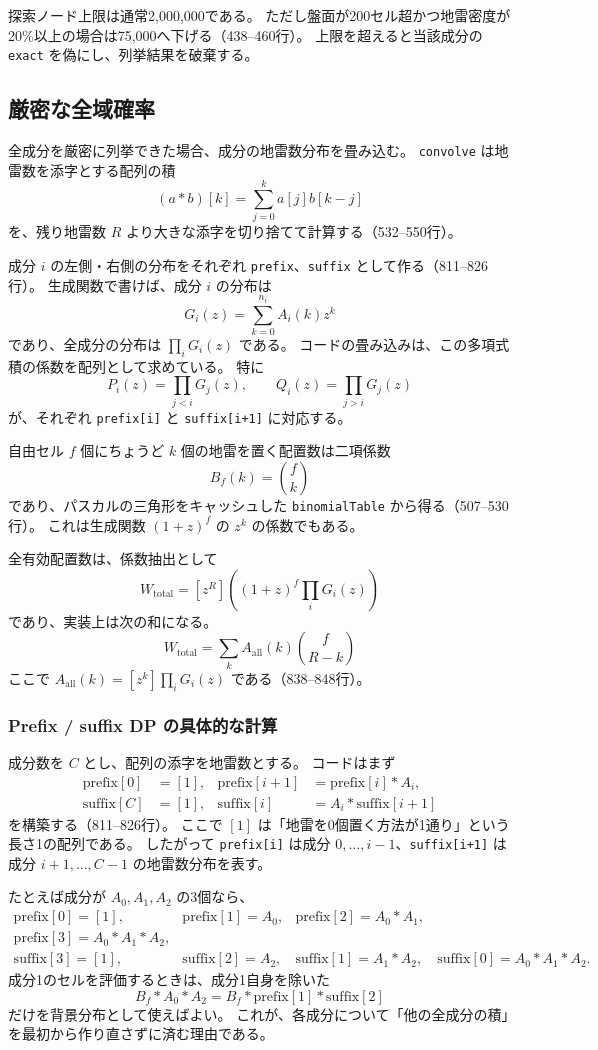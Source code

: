 \documentclass[uplatex,dvipdfmx,11pt]{jsarticle}
\newcommand{\code}[1]{\texttt{#1}}
\begin{document}
探索ノード上限は通常2,000,000である。
ただし盤面が200セル超かつ地雷密度が20\%以上の場合は75,000へ下げる（438--460行）。
上限を超えると当該成分の \code{exact} を偽にし、列挙結果を破棄する。

\subsection{厳密な全域確率}
全成分を厳密に列挙できた場合、成分の地雷数分布を畳み込む。
\code{convolve} は地雷数を添字とする配列の積
\[
  (a*b)[k]=\sum_{j=0}^{k}a[j]b[k-j]
\]
を、残り地雷数 $R$ より大きな添字を切り捨てて計算する（532--550行）。

成分 $i$ の左側・右側の分布をそれぞれ \code{prefix}、\code{suffix} として作る（811--826行）。
生成関数で書けば、成分 $i$ の分布は
\[
  G_i(z)=\sum_{k=0}^{n_i}A_i(k)z^k
\]
であり、全成分の分布は $\prod_iG_i(z)$ である。
コードの畳み込みは、この多項式積の係数を配列として求めている。
特に
\[
  P_i(z)=\prod_{j<i}G_j(z),\qquad
  Q_i(z)=\prod_{j>i}G_j(z)
\]
が、それぞれ \code{prefix[i]} と \code{suffix[i+1]} に対応する。

自由セル $f$ 個にちょうど $k$ 個の地雷を置く配置数は二項係数
\[
  B_f(k)=\binom{f}{k}
\]
であり、パスカルの三角形をキャッシュした \code{binomialTable} から得る（507--530行）。
これは生成関数 $(1+z)^f$ の $z^k$ の係数でもある。

全有効配置数は、係数抽出として
\[
  W_{\mathrm{total}}
  =
  [z^R]\left((1+z)^f\prod_iG_i(z)\right)
\]
であり、実装上は次の和になる。
\[
  W_{\mathrm{total}}
  =\sum_k A_{\mathrm{all}}(k)\binom{f}{R-k}
\]
ここで $A_{\mathrm{all}}(k)=[z^k]\prod_iG_i(z)$ である（838--848行）。

\subsubsection{Prefix / suffix DP の具体的な計算}
成分数を $C$ とし、配列の添字を地雷数とする。
コードはまず
\[
\begin{aligned}
  \mathrm{prefix}[0] &= [1],&
  \mathrm{prefix}[i+1] &= \mathrm{prefix}[i]*A_i,\\
  \mathrm{suffix}[C] &= [1],&
  \mathrm{suffix}[i] &= A_i*\mathrm{suffix}[i+1]
\end{aligned}
\]
を構築する（811--826行）。
ここで $[1]$ は「地雷を0個置く方法が1通り」という長さ1の配列である。
したがって \code{prefix[i]} は成分 $0,\ldots,i-1$、\code{suffix[i+1]} は成分 $i+1,\ldots,C-1$ の地雷数分布を表す。

たとえば成分が $A_0,A_1,A_2$ の3個なら、
\[
\begin{array}{lll}
  \mathrm{prefix}[0]=[1],&
  \mathrm{prefix}[1]=A_0,&
  \mathrm{prefix}[2]=A_0*A_1,\\
  \mathrm{prefix}[3]=A_0*A_1*A_2,&&\\
  \mathrm{suffix}[3]=[1],&
  \mathrm{suffix}[2]=A_2,&
  \mathrm{suffix}[1]=A_1*A_2,\quad
  \mathrm{suffix}[0]=A_0*A_1*A_2.
\end{array}
\]
成分1のセルを評価するときは、成分1自身を除いた
\[
  B_f*A_0*A_2
  =
  B_f*\mathrm{prefix}[1]*\mathrm{suffix}[2]
\]
だけを背景分布として使えばよい。
これが、各成分について「他の全成分の積」を最初から作り直さずに済む理由である。
\end{document}
